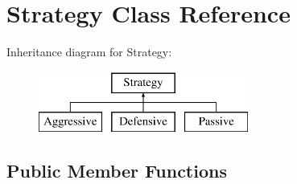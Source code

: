 \hypertarget{classStrategy}{}\section{Strategy Class Reference}
\label{classStrategy}
Inheritance diagram for Strategy\+:\begin{figure}[H]
\begin{center}
\leavevmode
\includegraphics[height=2.000000cm]{classStrategy}
\end{center}
\end{figure}
\subsection*{Public Member Functions}
